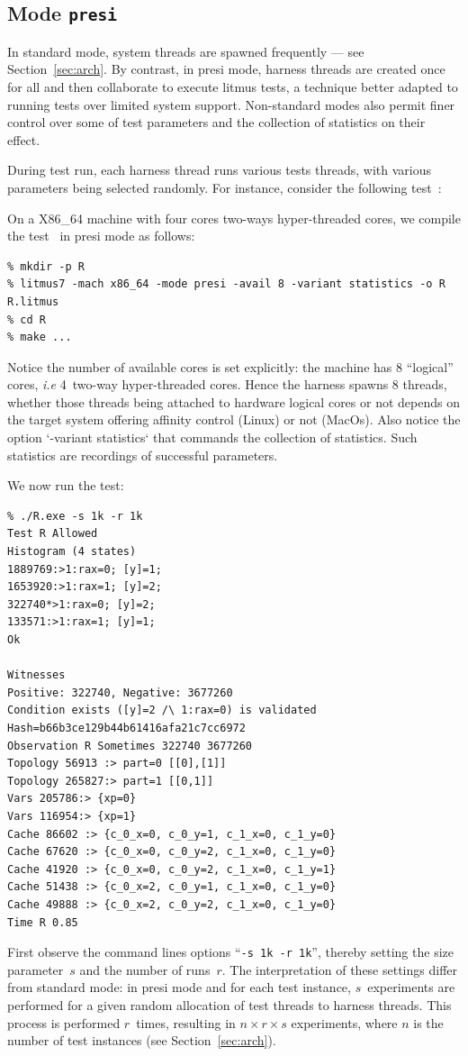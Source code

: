 \subsection{\label{sec:presi}Mode \texttt{presi}}
In standard mode, system threads are spawned frequently
--- see Section~\ref{sec:arch}.
By contrast, in presi mode, harness threads  are created once for
all and then collaborate  to execute  litmus tests, a technique better
adapted to running tests over limited system support. Non-standard
modes also permit finer control over some of test parameters and the
collection of statistics on their effect.

During test run, each harness thread runs various tests threads,
with various parameters being selected randomly.
For instance, consider the following test~:

On a X86\_64  machine with four cores two-ways hyper-threaded cores,
we compile the test~ in presi mode as follows:
\begin{verbatim}
% mkdir -p R
% litmus7 -mach x86_64 -mode presi -avail 8 -variant statistics -o R R.litmus
% cd R
% make ...
\end{verbatim}
Notice the number of available cores is set explicitly:
the machine has 8 ``logical'' cores, \emph{i.e}
4~two-way hyper-threaded cores. Hence the harness spawns 8 threads,
whether those threads being attached to hardware logical cores or not
depends on the target system offering affinity control (Linux) or not (MacOs).
Also notice the option `-variant statistics` that commands
the collection of statistics.
Such statistics are recordings of successful parameters.

We now run the  test:
\begin{verbatim}
% ./R.exe -s 1k -r 1k
Test R Allowed
Histogram (4 states)
1889769:>1:rax=0; [y]=1;
1653920:>1:rax=1; [y]=2;
322740*>1:rax=0; [y]=2;
133571:>1:rax=1; [y]=1;
Ok

Witnesses
Positive: 322740, Negative: 3677260
Condition exists ([y]=2 /\ 1:rax=0) is validated
Hash=b66b3ce129b44b61416afa21c7cc6972
Observation R Sometimes 322740 3677260
Topology 56913 :> part=0 [[0],[1]]
Topology 265827:> part=1 [[0,1]]
Vars 205786:> {xp=0}
Vars 116954:> {xp=1}
Cache 86602 :> {c_0_x=0, c_0_y=1, c_1_x=0, c_1_y=0}
Cache 67620 :> {c_0_x=0, c_0_y=2, c_1_x=0, c_1_y=0}
Cache 41920 :> {c_0_x=0, c_0_y=2, c_1_x=0, c_1_y=1}
Cache 51438 :> {c_0_x=2, c_0_y=1, c_1_x=0, c_1_y=0}
Cache 49888 :> {c_0_x=2, c_0_y=2, c_1_x=0, c_1_y=0}
Time R 0.85

\end{verbatim}
First observe the command lines options ``\texttt{-s 1k -r 1k}'',
thereby setting the size parameter~$s$  and the number of
runs~$r$. The interpretation of  these settings differ from  standard
mode: in presi mode and for each test instance, $s$~experiments are
performed for a given random allocation of test threads to harness
threads. This process is performed $r$~times, resulting in $n \times
r \times s$ experiments, where $n$ is the number of test instances
(see Section~\ref{sec:arch}).

